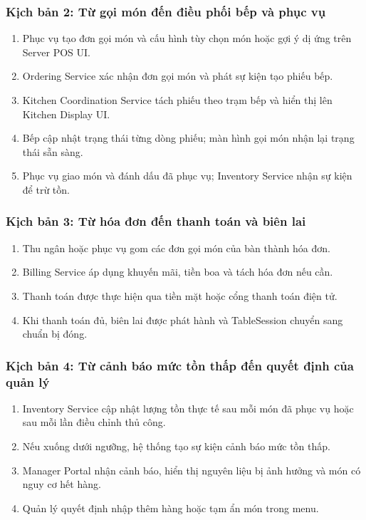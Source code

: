 \documentclass[11pt,a4paper]{article}
\begin{document}
\subsubsection{Kịch bản 2: Từ gọi món đến điều phối bếp và phục vụ}
\begin{enumerate}
  \item Phục vụ tạo đơn gọi món và cấu hình tùy chọn món hoặc gợi ý dị ứng trên \textsf{Server POS UI}.
  \item \textsf{Ordering Service} xác nhận đơn gọi món và phát sự kiện tạo phiếu bếp.
  \item \textsf{Kitchen Coordination Service} tách phiếu theo trạm bếp và hiển thị lên \textsf{Kitchen Display UI}.
  \item Bếp cập nhật trạng thái từng dòng phiếu; màn hình gọi món nhận lại trạng thái sẵn sàng.
  \item Phục vụ giao món và đánh dấu đã phục vụ; \textsf{Inventory Service} nhận sự kiện để trừ tồn.
\end{enumerate}

\subsubsection{Kịch bản 3: Từ hóa đơn đến thanh toán và biên lai}
\begin{enumerate}
  \item Thu ngân hoặc phục vụ gom các đơn gọi món của bàn thành hóa đơn.
  \item \textsf{Billing Service} áp dụng khuyến mãi, tiền boa và tách hóa đơn nếu cần.
  \item Thanh toán được thực hiện qua tiền mặt hoặc cổng thanh toán điện tử.
  \item Khi thanh toán đủ, biên lai được phát hành và \textsf{TableSession} chuyển sang chuẩn bị đóng.
\end{enumerate}

\subsubsection{Kịch bản 4: Từ cảnh báo mức tồn thấp đến quyết định của quản lý}
\begin{enumerate}
  \item \textsf{Inventory Service} cập nhật lượng tồn thực tế sau mỗi món đã phục vụ hoặc sau mỗi lần điều chỉnh thủ công.
  \item Nếu xuống dưới ngưỡng, hệ thống tạo sự kiện cảnh báo mức tồn thấp.
  \item \textsf{Manager Portal} nhận cảnh báo, hiển thị nguyên liệu bị ảnh hưởng và món có nguy cơ hết hàng.
  \item Quản lý quyết định nhập thêm hàng hoặc tạm ẩn món trong menu.
\end{enumerate}
\end{document}
